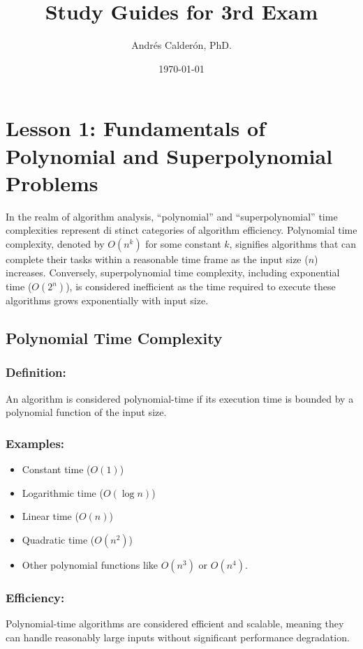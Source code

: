\documentclass[letter, 12pt]{article}
\title{Study Guides for 3rd Exam}
\author{Andrés Calderón, PhD.}
\date{\today}
\begin{document}
    \maketitle

    \section{Lesson 1: Fundamentals of Polynomial and Superpolynomial Problems}

    In the realm of algorithm analysis, ``polynomial'' and ``superpolynomial'' time complexities represent di
     stinct categories of algorithm efficiency. Polynomial time complexity, denoted by $O(n^k)$ for some constant $k$, signifies algorithms that can complete their tasks within a reasonable time frame as the input size ($n$) increases. Conversely, superpolynomial time complexity, including exponential time ($O(2^n)$), is considered inefficient as the time required to execute these algorithms grows exponentially with input size.

    \subsection{Polynomial Time Complexity}

    \subsubsection{Definition:}
    An algorithm is considered polynomial-time if its execution time is bounded by a polynomial function of the input size.

    \subsubsection{Examples:}
    \begin{itemize}
        \item Constant time ($O(1)$)
        \item Logarithmic time ($O(\log n)$)
        \item Linear time ($O(n)$)
        \item Quadratic time ($O(n^2)$)
        \item Other polynomial functions like $O(n^3)$ or $O(n^4)$.
    \end{itemize}

    \subsubsection{Efficiency:}
    Polynomial-time algorithms are considered efficient and scalable, meaning they can handle reasonably large inputs without significant performance degradation.
\end{document}
